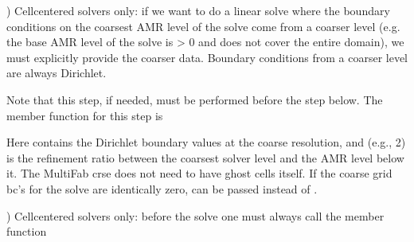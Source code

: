 \documentclass[letterpaper,10pt,english]{sphinxmanual}
\begin{document}
) Cell\sphinxhyphen{}centered solvers only:
if we want to do a linear solve where the boundary conditions on the
coarsest AMR level of the solve come from a coarser level (e.g. the
base AMR level of the solve is \textgreater{} 0 and does not cover the entire domain),
we must explicitly provide the coarser data.  Boundary conditions from a
coarser level are always Dirichlet.

\sphinxAtStartPar
Note that this step, if needed, must be performed before the step below.
The  member function for this step is

\begin{sphinxVerbatim}[commandchars=\\\{\}]
      
\end{sphinxVerbatim}

\sphinxAtStartPar
Here  contains the Dirichlet boundary
values at the coarse resolution, and  (e.g., 2)
is the refinement ratio between the coarsest solver level and the AMR
level below it.  The MultiFab crse does not need to have ghost cells itself.
If the coarse grid bc’s for the solve are identically zero, 
can be passed instead of .

) Cell\sphinxhyphen{}centered solvers only:
before the solve one must always call the  member function

\begin{sphinxVerbatim}[commandchars=\\\{\}]
       
                           
                           
                             
\end{sphinxVerbatim}
\end{document}
